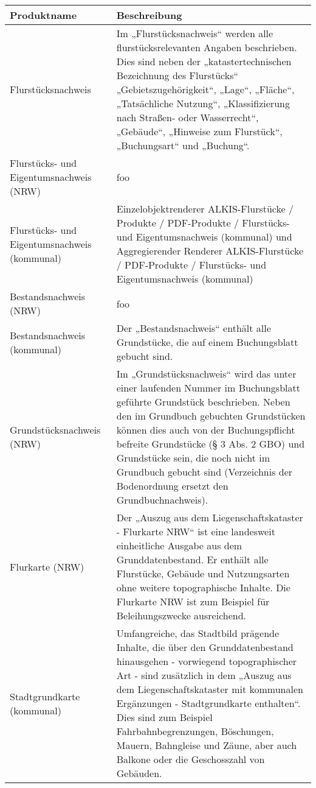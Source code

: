 \begin{longtable}{|p{}|p{}|}
	\hline 
	Produktname & Beschreibung \\ 
	\hline 
	\endhead
	Flurstücksnachweis
	&
	Im „Flurstücksnachweis“ werden alle flurstücksrelevanten Angaben beschrieben. Dies sind
	neben der „katastertechnischen Bezeichnung des Flurstücks“ „Gebietszugehörigkeit“, „Lage“,
	„Fläche“, „Tatsächliche Nutzung“, „Klassifizierung nach Straßen- oder Wasserrecht“, „Gebäude“, „Hinweise zum Flurstück“, „Buchungsart“ und „Buchung“. \autocite{adv-alkis-erlaeuterung} \\ 
	\hline
	Flurstücks- und Eigentumsnachweis (NRW)
	&
	foo \\
	\hline
	Flurstücks- und Eigentumsnachweis (kommunal)
	&
	Einzelobjektrenderer ALKIS-Flurstücke / Produkte / PDF-Produkte / Flurstücks- und Eigentumsnachweis (kommunal) und Aggregierender Renderer ALKIS-Flurstücke / PDF-Produkte / Flurstücks- und Eigentumsnachweis (kommunal) \\
	\hline
	Bestandsnachweis (NRW)
	&
	foo \\
	\hline
	Bestandsnachweis (kommunal)
	&
	Der „Bestandsnachweis“ enthält alle Grundstücke, die auf einem Buchungsblatt gebucht sind. \\
	\hline
	Grundstücksnachweis (NRW)
	&
	Im „Grundstücksnachweis“ wird das unter einer laufenden Nummer im Buchungsblatt geführte Grundstück beschrieben. Neben den im Grundbuch gebuchten Grundstücken können
	dies auch von der Buchungspflicht befreite Grundstücke (§ 3 Abs. 2 GBO) und Grundstücke
	sein, die noch nicht im Grundbuch gebucht sind (Verzeichnis der Bodenordnung ersetzt den
	Grundbuchnachweis). \autocite{adv-alkis-erlaeuterung}\\
	\hline
	Flurkarte (NRW)
	&
	Der „Auszug aus dem Liegenschaftskataster - Flurkarte NRW“  ist eine landesweit einheitliche Ausgabe aus dem Grunddatenbestand. Er enthält alle Flurstücke, Gebäude und Nutzungsarten ohne weitere topographische Inhalte. Die Flurkarte NRW ist zum Beispiel für Beleihungszwecke ausreichend. \autocite{wupp-alkis} \\
	\hline
	Stadtgrundkarte (kommunal)
	&
	Umfangreiche, das Stadtbild prägende Inhalte, die über den Grunddatenbestand hinausgehen - vorwiegend topographischer Art - sind zusätzlich in dem „Auszug aus dem Liegenschaftskataster mit kommunalen Ergänzungen - Stadtgrundkarte enthalten“.
	Dies sind zum Beispiel Fahrbahnbegrenzungen, Böschungen, Mauern, Bahngleise und Zäune, aber auch Balkone oder die Geschosszahl von Gebäuden. 
			

\end{longtable}
